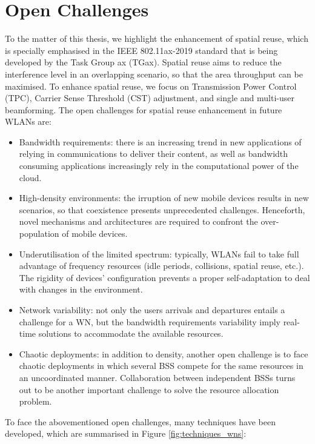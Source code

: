 \documentclass[12pt, a4paper,twoside]{tesi_upf}
\begin{document}
		\section{Open Challenges}
		\label{section:open_challenges}
			To the matter of this thesis, we highlight the enhancement of spatial reuse, which is specially emphasised in the IEEE 802.11ax-2019 standard that is being developed by the Task Group ax (TGax). Spatial reuse aims to reduce the interference level in an overlapping scenario, so that the area throughput can be maximised. To enhance spatial reuse, we focus on Transmission Power Control (TPC), Carrier Sense Threshold (CST) adjustment, and single and multi-user beamforming. The open challenges for spatial reuse enhancement in future WLANs are:
			\begin{itemize}
				\item Bandwidth requirements: there is an increasing trend in new applications of relying in communications to deliver their content, as well as bandwidth consuming applications increasingly rely in the computational power of the cloud.
				\item High-density environments: the irruption of new mobile devices results in new scenarios, so that coexistence presents unprecedented challenges. Henceforth, novel mechanisms and architectures are required to confront the over-population of mobile devices. 
				\item Underutilisation of the limited spectrum: typically, WLANs fail to take full advantage of frequency resources (idle periods, collisions, spatial reuse, etc.). The rigidity of devices' configuration prevents a proper self-adaptation to deal with changes in the environment.		
				\item Network variability: not only the users arrivals and departures entails a challenge for a WN, but the bandwidth requirements variability imply real-time solutions to accommodate the available resources.
				\item Chaotic deployments: in addition to density, another open challenge is to face chaotic deployments in which several BSS compete for the same resources in an uncoordinated manner. Collaboration between independent BSSs turns out to be another important challenge to solve the resource allocation problem.
			\end{itemize}
			To face the abovementioned open challenges, many techniques have been developed, which are summarised in Figure \ref{fig:techniques_wns}:
\end{document}
